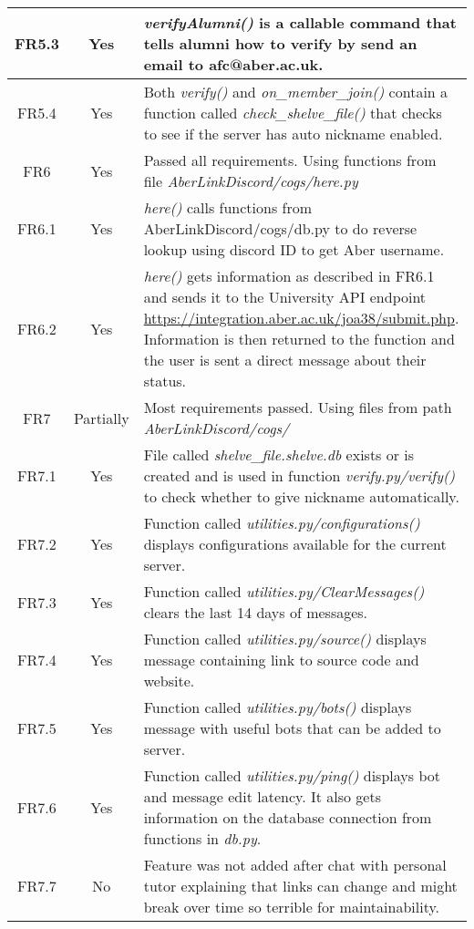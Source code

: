 \begin{longtable}{| c | c | p{10cm} |}
\hline
FR5.3 & \color{ForestGreen}Yes & \textit{verifyAlumni()} is a callable command that tells alumni how to verify by send an email to afc@aber.ac.uk.\\
\hline
FR5.4 & \color{ForestGreen}Yes & Both \textit{verify()} and \textit{on\_member\_join()} contain a function called \textit{check\_shelve\_file()} that checks to see if the server has auto nickname enabled.\\
\hline
FR6 & \color{ForestGreen}Yes & Passed all requirements. Using functions from file \textit{AberLinkDiscord/cogs/here.py}\\
\hline
FR6.1 & \color{ForestGreen}Yes & \textit{here()} calls functions from AberLinkDiscord/cogs/db.py to do reverse lookup using discord ID to get Aber username.\\
\hline
FR6.2 & \color{ForestGreen}Yes & \textit{here()} gets information as described in FR6.1 and sends it to the University API endpoint \url{https://integration.aber.ac.uk/joa38/submit.php}. Information is then returned to the function and the user is sent a direct message about their status.\\
\hline
FR7 & \color{orange}Partially & Most requirements passed. Using files from path \textit{AberLinkDiscord/cogs/}\\
\hline
FR7.1 & \color{ForestGreen}Yes & File called \textit{shelve\_file.shelve.db} exists or is created and is used in function \textit{verify.py/verify()} to check whether to give nickname automatically.\\
\hline
FR7.2 & \color{ForestGreen}Yes & Function called \textit{utilities.py/configurations()} displays configurations available for the current server.\\
\hline
FR7.3 & \color{ForestGreen}Yes & Function called \textit{utilities.py/ClearMessages()} clears the last 14 days of messages.\\
\hline
FR7.4 & \color{ForestGreen}Yes & Function called \textit{utilities.py/source()} displays message containing link to source code and website.\\
\hline
FR7.5 & \color{ForestGreen}Yes & Function called \textit{utilities.py/bots()} displays message with useful bots that can be added to server.\\
\hline
FR7.6 & \color{ForestGreen}Yes & Function called \textit{utilities.py/ping()} displays bot and message edit latency. It also gets information on the database connection from functions in \textit{db.py}.\\
\hline
FR7.7 & \color{red}No & Feature was not added after chat with personal tutor explaining that links can change and might break over time so terrible for maintainability.\\

\end{longtable}
